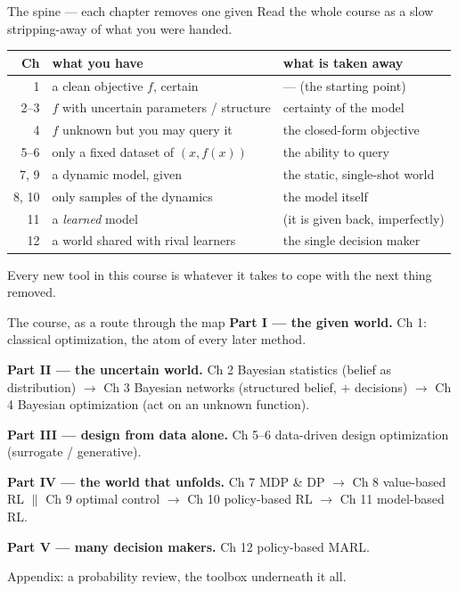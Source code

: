 \documentclass[10pt, aspectratio=169]{beamer}
\begin{document}
\begin{frame}{The spine --- each chapter removes one given}
Read the whole course as a slow stripping-away of what you were handed.
\medskip
\begin{center}\footnotesize\renewcommand{\arraystretch}{1.3}
\begin{tabular}{r|l|l}
\textbf{Ch} & \textbf{what you have} & \textbf{what is taken away} \\
\hline
1 & a clean objective $f$, certain & --- (the starting point) \\
2--3 & $f$ with uncertain parameters / structure & certainty of the model \\
4 & $f$ unknown but you may query it & the closed-form objective \\
5--6 & only a fixed dataset of $(x,f(x))$ & the ability to query \\
7, 9 & a dynamic model, given & the static, single-shot world \\
8, 10 & only samples of the dynamics & the model itself \\
11 & a \emph{learned} model & (it is given back, imperfectly) \\
12 & a world shared with rival learners & the single decision maker \\
\end{tabular}
\end{center}
\medskip

\pause
\begin{center}\large
Every new tool in this course is \alert{whatever it takes to cope with the next thing removed.}
\end{center}
\end{frame}

\begin{frame}{The course, as a route through the map}
\textbf{Part I --- the given world.} \;Ch 1: classical optimization, the atom of every later method.
\medskip

\textbf{Part II --- the uncertain world.} \;Ch 2 Bayesian statistics (belief as distribution) $\to$ Ch 3 Bayesian networks (structured belief, $+$ decisions) $\to$ Ch 4 Bayesian optimization (act on an unknown function).
\medskip

\textbf{Part III --- design from data alone.} \;Ch 5--6 data-driven design optimization (surrogate / generative).
\medskip

\textbf{Part IV --- the world that unfolds.} \;Ch 7 MDP \& DP $\to$ Ch 8 value-based RL \;$\|$\; Ch 9 optimal control $\to$ Ch 10 policy-based RL $\to$ Ch 11 model-based RL.
\medskip

\textbf{Part V --- many decision makers.} \;Ch 12 policy-based MARL.
\medskip

\pause
{\footnotesize\textcolor{mLightBrown}{Appendix: a probability review, the toolbox underneath it all.}}
\end{frame}
\end{document}
